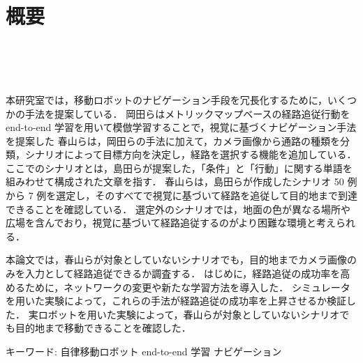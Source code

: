 \chapter*{概要}
\thispagestyle{empty}
%
\begin{center}
  \scalebox{1.0}{視覚と行動のend-to-end学習により}\\
  \vspace{-1.0zh}
  \scalebox{1.0}{経路追従行動を模倣する手法の提案}\\
  \scalebox{1.0}{-経路選択の成功率向上を意図したネットワークの変更と実験的評価-}\\
\end{center}
\vspace{1.0zh}

本研究室では，移動ロボットのナビゲーション手段を冗長化するために，いくつかの手法を提案している．
岡田らはメトリックマップベースの経路追従行動を end-to-end 学習を用いて模倣学習することで，視覚に基づくナビゲーション手法を提案した
春山らは，岡田らの手法に加えて，カメラ画像から通路の種類を分類，シナリオによって目標方向を決定し，経路を選択する機能を追加している．
ここでのシナリオとは，島田らが提案した，「条件」と「行動」に関する単語を組みわせて構成された文章を指す．
春山らは，島田ら\cite{shimada2020}が作成したシナリオ 50 例から 7 例を選定し，そのすべてで視覚に基づいて経路を追従して目的地まで到達できることを確認している．
選定外のシナリオでは，地面の色が異なる場所や広場を含んでおり，視覚に基づいて経路追従するのがより困難な環境と考えられる．

本論文では，春山らが対象としていないシナリオでも，目的地までカメラ画像のみを入力として経路追従できるか調査する．
はじめに，経路追従の成功率を高めるために，ネットワークの変更や新たな学習方法を導入した．
シミュレータを用いた実験によって，これらの手法が経路追従の成功率を上昇させるか検証した．
実ロボットを用いた実験によって，春山らが対象としていないシナリオでも目的地まで移動できることを確認した．

キーワード: 自律移動ロボット end-to-end 学習 ナビゲーション
%
\newpage
